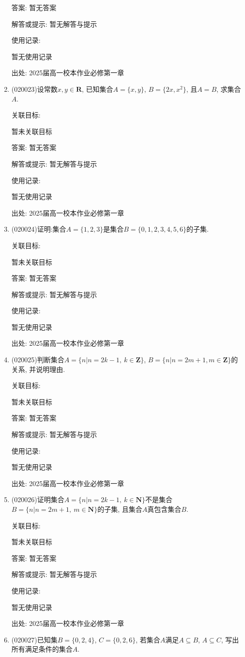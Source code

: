 \documentclass[10pt,a4paper]{article}
\begin{document}
\begin{enumerate}[1.]
答案: 暂无答案

解答或提示: 暂无解答与提示

使用记录:

暂无使用记录


出处: 2025届高一校本作业必修第一章
\item { (020023)}设常数$x,y\in \mathbf{R}$, 已知集合$A=\{x, y\}$, $B=\{2x, x^2\}$, 且$A=B$, 求集合$A$.


关联目标:

暂未关联目标

答案: 暂无答案

解答或提示: 暂无解答与提示

使用记录:

暂无使用记录


出处: 2025届高一校本作业必修第一章
\item { (020024)}证明:集合$A=\{1,2,3\}$是集合$B=\{0,1,2,3,4,5,6\}$的子集.


关联目标:

暂未关联目标

答案: 暂无答案

解答或提示: 暂无解答与提示

使用记录:

暂无使用记录


出处: 2025届高一校本作业必修第一章
\item { (020025)}判断集合$A=\{n|n=2k-1,\ k\in \mathbf{Z}\}$, $B=\{n|n=2m+1,m\in \mathbf{Z}\}$的关系, 并说明理由.


关联目标:

暂未关联目标

答案: 暂无答案

解答或提示: 暂无解答与提示

使用记录:

暂无使用记录


出处: 2025届高一校本作业必修第一章
\item { (020026)}证明集合$A=\{n|n=2k-1,\ k\in \mathbf{N}\}$不是集合$B=\{n|n=2m+1, \ m\in \mathbf{N}\}$的子集, 且集合$A$真包含集合$B$.


关联目标:

暂未关联目标

答案: 暂无答案

解答或提示: 暂无解答与提示

使用记录:

暂无使用记录


出处: 2025届高一校本作业必修第一章
\item { (020027)}已知集$B=\{0, 2, 4\}$, $C=\{0, 2, 6\}$, 若集合$A$满足$A\subseteq B$, $A\subseteq C$, 写出所有满足条件的集合$A$.



\end{enumerate}
\end{document}

